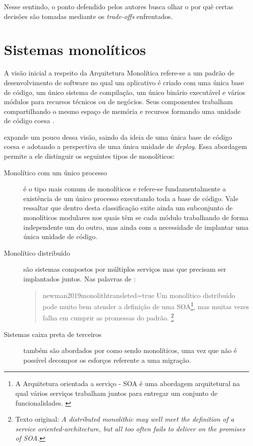 Nesse sentindo, o ponto defendido pelos autores busca olhar o por quê certas decisões são
tomadas mediante os \textit{trade-offs} enfrentados.

\section{Sistemas monolíticos}
\label{monolithics}

A visão inicial a respeito da Arquitetura Monolítica refere-se a um padrão de desenvolvimento
de software no qual um aplicativo é criado com uma única base de código, um único sistema de compilação,
um único binário executável e vários módulos para recursos técnicos ou de negócios. Seus componentes
trabalham compartilhando o mesmo espaço de memória e recursos formando uma unidade de
código coesa \cite{NatalliaSakovich}.

 expande um pouco dessa visão, saindo da ideia de uma única base
de código coesa e adotando a perspectiva de uma única unidade de \textit{deploy}. Essa abordagem
permite a ele distinguir os seguintes tipos de monolíticos:

\begin{description}
    \item [Monolítico com um único processo] é o tipo mais comum de monolíticos e refere-se
        fundamentalmente a existência de um único processo executando toda a base de código. Vale
        ressaltar que dentro desta classificação exite ainda um subconjunto de monolíticos
        modulares nos quais têm se cada módulo trabalhando de forma independente um do outro, mas
        ainda com a necessidade de implantar uma única unidade de código.

    \item [Monolítico distribuído] são sistemas compostos por múltiplos serviços mas que precisam
        ser implantados juntos. Nas palavras de :

        \begin{quotation}{newman2019monolith}{transleted=true}
            Um monolítico distribuído pode muito bem atender a definição de uma
            \gls{SOA}\footnote{A Arquitetura orientada a serviço - SOA é uma abordagem arquitetural na qual
            vários serviços trabalham juntos para entregar um conjunto de funcionalidades.
            \cite{Newman2015}}, mas muitas vezes falha em cumprir as promessas do padrão.
            \footnote{Texto original: \textit{A distributed monolithic may well meet the definition of a
            service oriented-architecture, but all too often fails to deliver on the promises of SOA.}}
        \end{quotation}
    \item [Sistemas caixa preta de terceiros] também são abordados por 
        como sendo monolíticos, uma vez que não é possível decompor os esforços referente a uma
        migração.
\end{description}

